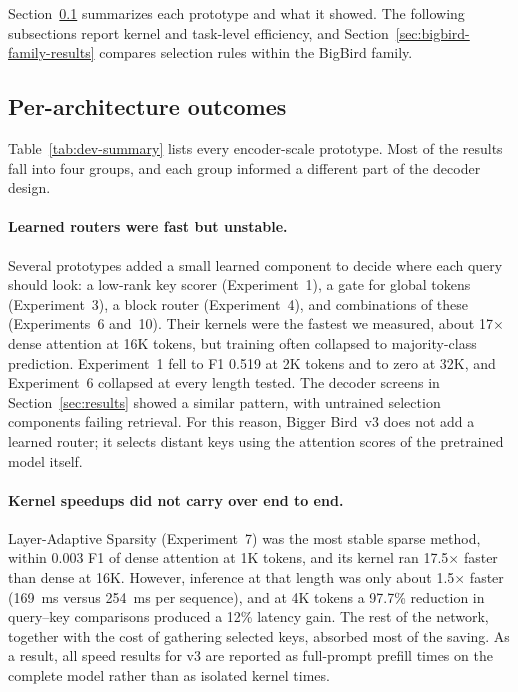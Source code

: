 \documentclass[11pt]{article}
\begin{document}
Section~\ref{sec:dev-outcomes} summarizes each prototype and what it showed.
The following subsections report kernel and task-level efficiency, and
Section~\ref{sec:bigbird-family-results} compares selection rules within the
BigBird family.

\subsection{Per-architecture outcomes}
\label{sec:dev-outcomes}

Table~\ref{tab:dev-summary} lists every encoder-scale prototype. Most of the
results fall into four groups, and each group informed a different part of
the decoder design.

\paragraph{Learned routers were fast but unstable.}
Several prototypes added a small learned component to decide where each query
should look: a low-rank key scorer (Experiment~1), a gate for global tokens
(Experiment~3), a block router (Experiment~4), and combinations of these
(Experiments~6 and~10). Their kernels were the fastest we measured, about
17$\times$ dense attention at 16K tokens, but training often collapsed to
majority-class prediction. Experiment~1 fell to F1 0.519 at 2K tokens and to
zero at 32K, and Experiment~6 collapsed at every length tested. The decoder
screens in Section~\ref{sec:results} showed a similar pattern, with untrained
selection components failing retrieval. For this reason, Bigger Bird~v3 does
not add a learned router; it selects distant keys using the attention scores
of the pretrained model itself.

\paragraph{Kernel speedups did not carry over end to end.}
Layer-Adaptive Sparsity (Experiment~7) was the most stable sparse method,
within 0.003 F1 of dense attention at 1K tokens, and its kernel ran
17.5$\times$ faster than dense at 16K. However, inference at that length was
only about 1.5$\times$ faster (169~ms versus 254~ms per sequence), and at 4K
tokens a 97.7\% reduction in query--key comparisons produced a 12\% latency
gain. The rest of the network, together with the cost of gathering selected
keys, absorbed most of the saving. As a result, all speed results for v3 are
reported as full-prompt prefill times on the complete model rather than as
isolated kernel times.
\end{document}
